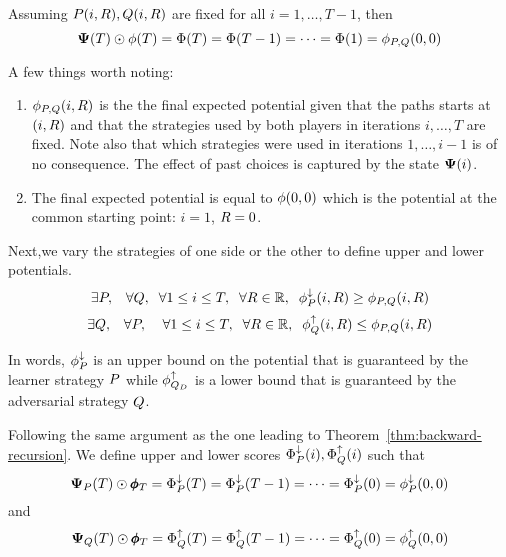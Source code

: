 \documentclass{article}[12pt]
\begin{document}
\begin{theorem} \label{thm:backward-recursion}
Assuming $ P(i,R), Q(i,R)$ are fixed for all
$i=1,\ldots,T-1$, then
\[
  {\bf \Psi}(T)\odot \phi(T)=\Phi(T)=\Phi(T-1)=\cdots=\Phi(1)=\phi_{P,Q}(0,0)
  \]
\end{theorem}

A few things worth noting:
\begin{enumerate}
\item $\phi_{P,Q}(i,R)$ is the the final expected potential
  given that the paths starts at $(i,R)$ and that
  the strategies used by both players in iterations $i,\ldots,T$ are fixed. Note
  also that which strategies were used in iterations $1,\ldots,i-1$ is
  of no consequence. The effect of past choices is captured by the
  state ${\bf \Psi}(i)$.
\item
  The final expected potential is equal to $\phi(0,0)$ which is the
  potential at the common starting point: $i=1$, $R=0$.
\end{enumerate}

Next,we vary the strategies of one side or the other to define upper
and lower potentials.
\begin{equation} \label{eqn:upperPotentials}
  \exists P, \;\;\; \forall Q,\;\; \forall 1\leq i \leq
  T,\;\; \forall R \in \mathbb{R},\;\; \phi_{P}^{\downarrow}(i,R) \geq \phi_{P,Q}(i,R)
\end{equation}
\begin{equation} \label{eqn:lowerPotentials}
  \exists Q, \;\;\; \forall P, \;\; \;\; \forall 1\leq i \leq
  T,\;\; \forall R \in \mathbb{R},\;\; \phi_{Q}^{\uparrow}(i,R) \leq \phi_{P,Q}(i,R)
\end{equation}

In words, $\phi_{P}^{\downarrow}$ is an upper bound on the potential that is 
guaranteed by the learner strategy $P$ while $\phi_{Q_D}^{\uparrow}$
is a lower bound that is guaranteed by the adversarial
strategy $Q$.

Following the same argument as the one leading to
Theorem~\ref{thm:backward-recursion}. We define upper and lower scores
$\Phi_{P}^{\downarrow}(i),\Phi_{Q}^{\uparrow}(i)$ such that
\begin{equation} \label{eqn:upper-recursion}
  {\bf \Psi}_{P}(T)\odot \pmb{\phi}_{T}=\Phi_{P}^{\downarrow}(T)=\Phi_{P}^{\downarrow}(T-1)=\cdots=\Phi_{P}^{\downarrow}(0)=\phi_{P}^{\downarrow}(0,0)
\end{equation}
and
\begin{equation} \label{eqn:lower-recursion}
  {\bf \Psi}_{Q}(T)\odot \pmb{\phi}_{T}=\Phi_{Q}^{\uparrow}(T)=\Phi_{Q}^{\uparrow}(T-1)=\cdots=\Phi_{Q}^{\uparrow}(0)=\phi_{Q}^{\uparrow}(0,0)
\end{equation}
\end{document}
